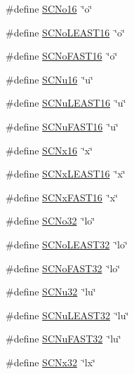 \begin{DoxyCompactItemize}
\item 
\#define \hyperlink{group__avr__inttypes_ga9bc6b517c0117327e832824ff2d6a6b5}{S\+C\+No16}~\char`\"{}o\char`\"{}
\item 
\#define \hyperlink{group__avr__inttypes_ga5b05c70b4807922992a9ca529361b44d}{S\+C\+No\+L\+E\+A\+S\+T16}~\char`\"{}o\char`\"{}
\item 
\#define \hyperlink{group__avr__inttypes_ga021e130b06fc46198c71dca0fdf89788}{S\+C\+No\+F\+A\+S\+T16}~\char`\"{}o\char`\"{}
\item 
\#define \hyperlink{group__avr__inttypes_ga37bbde0e3f124b7f482d54adb13b0248}{S\+C\+Nu16}~\char`\"{}u\char`\"{}
\item 
\#define \hyperlink{group__avr__inttypes_ga7a78b92618044bb2d798b57fc6a2e439}{S\+C\+Nu\+L\+E\+A\+S\+T16}~\char`\"{}u\char`\"{}
\item 
\#define \hyperlink{group__avr__inttypes_ga7cf58abc57bb03d809e6fc41c2a40c33}{S\+C\+Nu\+F\+A\+S\+T16}~\char`\"{}u\char`\"{}
\item 
\#define \hyperlink{group__avr__inttypes_ga12dbc2ac6a36b893ef1c25c357f90a9f}{S\+C\+Nx16}~\char`\"{}x\char`\"{}
\item 
\#define \hyperlink{group__avr__inttypes_ga24647dd309d4138846376a51a6098304}{S\+C\+Nx\+L\+E\+A\+S\+T16}~\char`\"{}x\char`\"{}
\item 
\#define \hyperlink{group__avr__inttypes_ga8b67140c216180e4e5d18003038ee689}{S\+C\+Nx\+F\+A\+S\+T16}~\char`\"{}x\char`\"{}
\item 
\#define \hyperlink{group__avr__inttypes_gab561c947d62a3c7cd396d4aeef553f3c}{S\+C\+No32}~\char`\"{}lo\char`\"{}
\item 
\#define \hyperlink{group__avr__inttypes_ga6b324310e03b8ecbe6888a52b7d8581d}{S\+C\+No\+L\+E\+A\+S\+T32}~\char`\"{}lo\char`\"{}
\item 
\#define \hyperlink{group__avr__inttypes_gae40f8b90cb75998e70910e7b377288a8}{S\+C\+No\+F\+A\+S\+T32}~\char`\"{}lo\char`\"{}
\item 
\#define \hyperlink{group__avr__inttypes_gabd19a83130f8d1bd2f77b765ad804f75}{S\+C\+Nu32}~\char`\"{}lu\char`\"{}
\item 
\#define \hyperlink{group__avr__inttypes_gae30d5cc7dbc15051e21b72229a2487f7}{S\+C\+Nu\+L\+E\+A\+S\+T32}~\char`\"{}lu\char`\"{}
\item 
\#define \hyperlink{group__avr__inttypes_ga4ce14b7ebee0cfd5c4c935cf79a9a504}{S\+C\+Nu\+F\+A\+S\+T32}~\char`\"{}lu\char`\"{}
\item 
\#define \hyperlink{group__avr__inttypes_ga4c5370556f793ac7b2c3abe896dba8e2}{S\+C\+Nx32}~\char`\"{}lx\char`\"{}

\end{DoxyCompactItemize}

